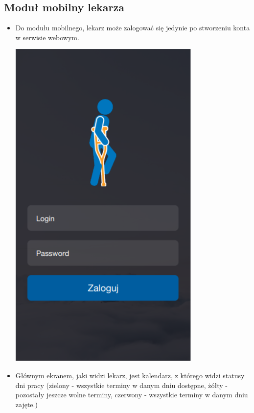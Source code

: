 \newpage
\subsection{Moduł mobilny lekarza}


\begin{itemize}
	\item Do modułu mobilnego, lekarz może zalogować się jedynie po stworzeniu konta w serwisie webowym. 

\vspace{0,5cm}
\begin{center}\includegraphics{obraz2/1.png}\end{center}
\vspace{0,5cm}

\newpage
	\item Głównym ekranem, jaki widzi lekarz, jest kalendarz, z którego widzi statusy dni pracy (zielony - wszystkie terminy w danym dniu dostępne, żółty - pozostały jeszcze wolne terminy, czerwony - wszystkie terminy w danym dniu zajęte.) 
	

\end{itemize}
